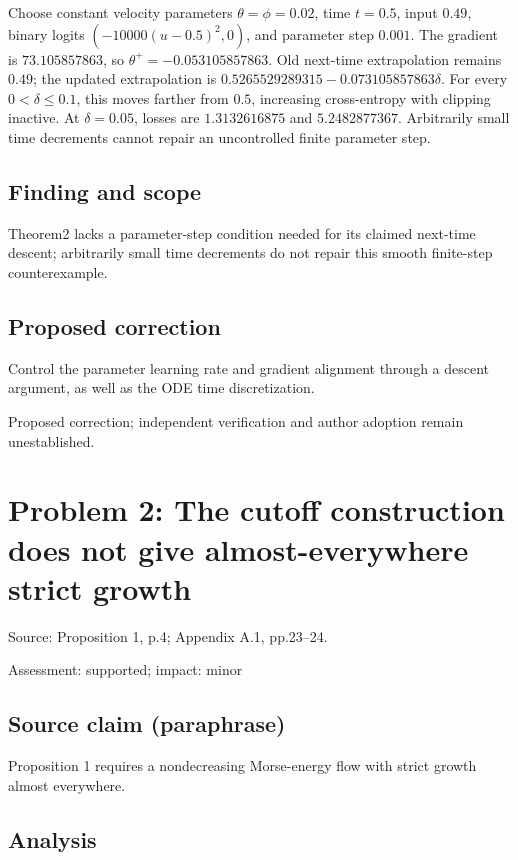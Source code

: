 \documentclass[11pt]{article}
\begin{document}
Choose constant velocity parameters \(\theta=\phi=0.02\), time \(t=0.5\), input \(0.49\), binary logits \((-10000(u-0.5)^2,0)\), and parameter step \(0.001\). The gradient is \(73.105857863\), so \(\theta^+=-0.053105857863\). Old next-time extrapolation remains \(0.49\); the updated extrapolation is \(0.5265529289315-0.073105857863\delta\). For every \(0<\delta\le0.1\), this moves farther from \(0.5\), increasing cross-entropy with clipping inactive. At \(\delta=0.05\), losses are \(1.3132616875\) and \(5.2482877367\). Arbitrarily small time decrements cannot repair an uncontrolled finite parameter step.

\subsection*{Finding and scope}

Theorem2 lacks a parameter-step condition needed for its claimed next-time descent; arbitrarily small time decrements do not repair this smooth finite-step counterexample.

\subsection*{Proposed correction}

Control the parameter learning rate and gradient alignment through a descent argument, as well as the ODE time discretization.

Proposed correction; independent verification and author adoption remain unestablished.

\section*{Problem 2: The cutoff construction does not give almost-everywhere strict growth}

Source: Proposition 1, p.4; Appendix A.1, pp.23–24.

Assessment: supported; impact: minor

\subsection*{Source claim (paraphrase)}

Proposition 1 requires a nondecreasing Morse-energy flow with strict growth almost everywhere.

\subsection*{Analysis}
\end{document}
